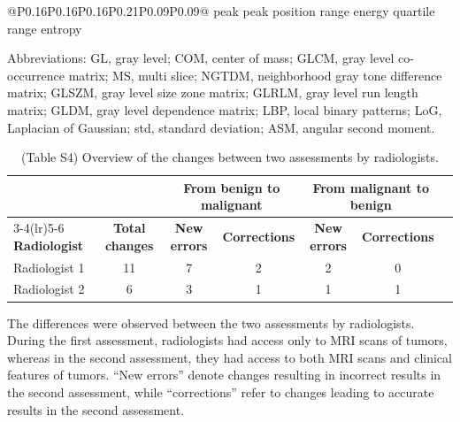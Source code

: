 \begin{table}
\begin{tabular}{@{}P{0.16\linewidth}P{0.16\linewidth}P{0.16\linewidth}P{0.21\linewidth}P{0.09\linewidth}P{0.09\linewidth}@{}}
peak \newline peak position \newline range \newline energy \newline quartile range \newline entropy \\
		\bottomrule
	\end{tabular}

	\vspace{1mm}
	\parbox{\linewidth}{\fontsize{6pt}{7pt}\selectfont Abbreviations: GL, gray level; COM, center of mass; GLCM, gray level co-occurrence matrix; MS, multi slice; NGTDM, neighborhood gray tone difference matrix; GLSZM, gray level size zone matrix; GLRLM, gray level run length matrix; GLDM, gray level dependence matrix; LBP, local binary patterns; LoG, Laplacian of Gaussian; std, standard deviation; ASM, angular second moment.}
\end{table}

\begin{table}[htbp]
	\caption{(Table S4) Overview of the changes between two assessments by radiologists.}
	\label{tab:ch2_S4}
	\small
	\setlength{\tabcolsep}{3pt}
	\begin{tabular}{@{}lcccccc@{}}
		\toprule
		& & \multicolumn{2}{c}{\textbf{From benign to malignant}} & \multicolumn{2}{c}{\textbf{From malignant to benign}} \\
		\cmidrule(lr){3-4}\cmidrule(lr){5-6}
		\textbf{Radiologist} & \textbf{Total changes} & \textbf{New errors} & \textbf{Corrections} & \textbf{New errors} & \textbf{Corrections} \\
		\midrule
		Radiologist 1 & 11 & 7 & 2 & 2 & 0 \\
		Radiologist 2 & 6 & 3 & 1 & 1 & 1 \\
		\bottomrule
	\end{tabular}

	\vspace{2mm}
	\parbox{\textwidth}{\footnotesize The differences were observed between the two assessments by radiologists. During the first assessment, radiologists had access only to MRI scans of tumors, whereas in the second assessment, they had access to both MRI scans and clinical features of tumors. ``New errors'' denote changes resulting in incorrect results in the second assessment, while ``corrections'' refer to changes leading to accurate results in the second assessment.}
\end{table}

